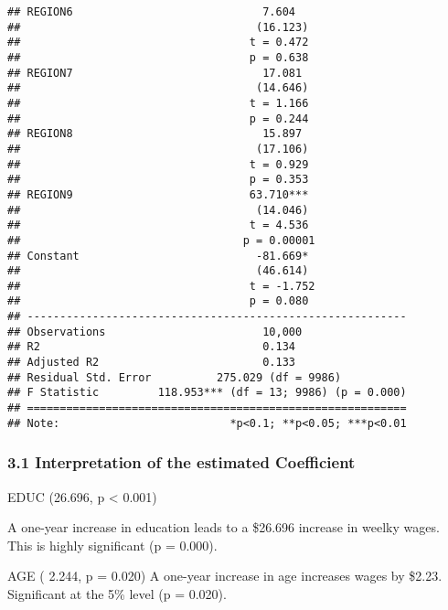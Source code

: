 \documentclass[
]{article}
\begin{document}
\begin{verbatim}
## REGION6                             7.604                 
##                                    (16.123)               
##                                   t = 0.472               
##                                   p = 0.638               
## REGION7                             17.081                
##                                    (14.646)               
##                                   t = 1.166               
##                                   p = 0.244               
## REGION8                             15.897                
##                                    (17.106)               
##                                   t = 0.929               
##                                   p = 0.353               
## REGION9                           63.710***               
##                                    (14.046)               
##                                   t = 4.536               
##                                  p = 0.00001              
## Constant                           -81.669*               
##                                    (46.614)               
##                                   t = -1.752              
##                                   p = 0.080               
## ----------------------------------------------------------
## Observations                        10,000                
## R2                                  0.134                 
## Adjusted R2                         0.133                 
## Residual Std. Error          275.029 (df = 9986)          
## F Statistic         118.953*** (df = 13; 9986) (p = 0.000)
## ==========================================================
## Note:                          *p<0.1; **p<0.05; ***p<0.01
\end{verbatim}

\subsubsection{\texorpdfstring{\textbf{3.1 Interpretation of the
estimated Coefficient
}}{3.1 Interpretation of the estimated Coefficient }}\label{interpretation-of-the-estimated-coefficient}

EDUC (26.696, p \textless{} 0.001)

A one-year increase in education leads to a \$26.696 increase in weelky
wages. This is highly significant (p = 0.000).

AGE ( 2.244, p = 0.020) A one-year increase in age increases wages by
\$2.23. Significant at the 5\% level (p = 0.020).
\end{document}
